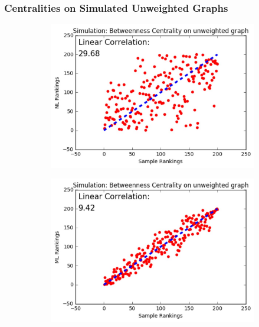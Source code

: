 \documentclass[9pt]{beamer}
\begin{document}
\begin{frame}
\frametitle{Centralities on Simulated Unweighted Graphs}
\vspace{0.15in}
\begin{figure}[H]
\centering
\begin{subfigure}{.32\textwidth}
  \centering
  \includegraphics[width=0.95\linewidth]{BCU_NL.jpeg}
\end{subfigure}
\begin{subfigure}{.32\textwidth}
	\centering
    \includegraphics[width=0.95\linewidth]{BCU_ML.jpeg}
\end{subfigure}
\begin{subfigure}{.32\textwidth}

\end{subfigure}
\end{figure}
\end{frame}
\end{document}
